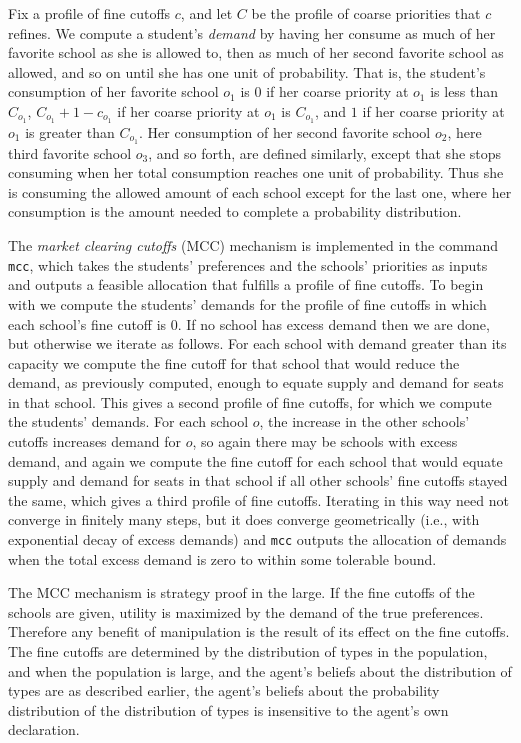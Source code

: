 \documentclass[12pt]{article}
\theoremstyle{definition}
\begin{document}
Fix a profile of fine cutoffs $c$, and let $C$ be the profile of
coarse priorities that $c$ refines.  We compute a student's
\emph{demand} by having her consume as much of her favorite school as
she is allowed to, then as much of her second favorite school as
allowed, and so on until she has one unit of probability.  That is,
the student's consumption of her favorite school $o_1$ is $0$ if her
coarse priority at $o_1$ is less than $C_{o_1}$, $C_{o_1} + 1 -
c_{o_1}$ if her coarse priority at $o_1$ is $C_{o_1}$, and $1$ if her
coarse priority at $o_1$ is greater than $C_{o_1}$.  Her consumption
of her second favorite school $o_2$, here third favorite school $o_3$,
and so forth, are defined similarly, except that she stops consuming
when her total consumption reaches one unit of probability.  Thus she
is consuming the allowed amount of each school except for the last
one, where her consumption is the amount needed to complete a
probability distribution.

The \emph{market clearing cutoffs} (MCC) mechanism is implemented in
the command \texttt{mcc}, which takes the students' preferences and
the schools' priorities as inputs and outputs a feasible allocation
that fulfills a profile of fine cutoffs.  To begin with we compute the
students' demands for the profile of fine cutoffs in which each
school's fine cutoff is $0$.  If no school has excess demand then we
are done, but otherwise we iterate as follows.  For each school with
demand greater than its capacity we compute the fine cutoff for that
school that would reduce the demand, as previously computed, enough to
equate supply and demand for seats in that school.  This gives a
second profile of fine cutoffs, for which we compute the students'
demands.  For each school $o$, the increase in the other schools'
cutoffs increases demand for $o$, so again there may be schools with
excess demand, and again we compute the fine cutoff for each school
that would equate supply and demand for seats in that school if all
other schools' fine cutoffs stayed the same, which gives a third
profile of fine cutoffs.  Iterating in this way need not converge in
finitely many steps, but it does converge geometrically (i.e., with
exponential decay of excess demands) and \texttt{mcc} outputs the
allocation of demands when the total excess demand is zero to within
some tolerable bound.

The MCC mechanism is strategy proof in the large.  If the fine cutoffs
of the schools are given, utility is maximized by the demand of the
true preferences.  Therefore any benefit of manipulation is the result
of its effect on the fine cutoffs.  The fine cutoffs are determined by
the distribution of types in the population, and when the population
is large, and the agent's beliefs about the distribution of types are
as described earlier, the agent's beliefs about the probability
distribution of the distribution of types is insensitive to the
agent's own declaration.  
\end{document}
